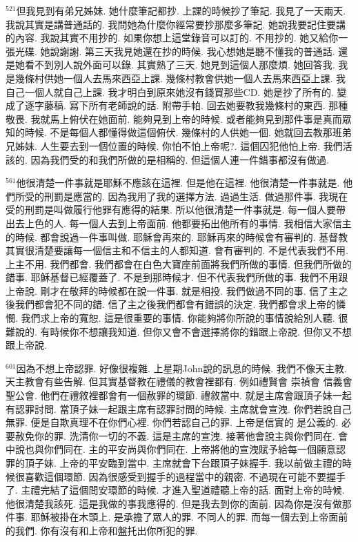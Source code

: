 \documentclass{book}
\begin{document}
$^{521}$但我見到有弟兄姊妹.
她什麼筆記都抄.
上課的時候抄了筆記.
我見了一天兩天.
我說其實是講普通話的.
我問她為什麼你經常要抄那麼多筆記.
她說我要記住要講的內容.
我說其實不用抄的.
如果你想上這堂錄音可以訂的.
不用抄的.
她又給你一張光碟.
她說謝謝.
第三天我見她還在抄的時候.
我心想她是聽不懂我的普通話.
還是她看不到別人說外面可以錄.
其實熟了三天.
她見到這個人那麼煩.
她回答我.
我是幾條村供她一個人去馬來西亞上課.
幾條村教會供她一個人去馬來西亞上課.
我自己一個人就自己上課.
我才明白到原來她沒有錢買那些CD.
她是抄了所有的.
變成了逐字藤稿.
寫下所有老師說的話.
附帶手帕.
回去她要教我幾條村的東西.
那種敬畏.
我就馬上俯伏在她面前.
能夠見到上帝的時候.
或者能夠見到那件事是真而眾知的時候.
不是每個人都懂得做這個俯伏.
幾條村的人供她一個.
她就回去教那班弟兄姊妹.
人生要去到一個位置的時候.
你怕不怕上帝呢?.
這個囚犯他怕上帝.
我們活該的.
因為我們受的和我們所做的是相稱的.
但這個人連一件錯事都沒有做過.

$^{561}$他很清楚一件事就是耶穌不應該在這裡.
但是他在這裡.
他很清楚一件事就是.
他們所受的刑罰是應當的.
因為我用了我的選擇方法.
過過生活.
做過那件事.
我現在受的刑罰是叫做履行他罪有應得的結果.
所以他很清楚一件事就是.
每一個人要帶出去上色的人.
每一個人去到上帝面前.
他都要拓出他所有的事情.
我相信大家信主的時候.
都會說過一件事叫做.
耶穌會再來的.
耶穌再來的時候會有審判的.
基督教其實很清楚要讓每一個信主和不信主的人都知道.
會有審判的.
不是代表我們不用.
上主不用.
我們都會.
我們都會在白色大寶座前面將我們所做的事情.
但我們所做的錯事.
耶穌基督已經覆蓋了.
不是到那時候才.
但不代表我們所做的事.
我們不用跟上帝說.
剛才在敬拜的時候都在說一件事.
就是相投.
我們做過不同的事.
信了主之後我們都會犯不同的錯.
信了主之後我們都會有錯誤的決定.
我們都會求上帝的憐憫.
我們求上帝的寬恕.
這是很重要的事情.
你能夠將你所說的事情說給別人聽.
很難說的.
有時候你不想讓我知道.
但你又會不會選擇將你的錯跟上帝說.
但你又不想跟上帝說.

$^{601}$因為不想上帝認罪.
好像很複雜.
上星期John說的訊息的時候.
我們不像天主教.
天主教會有些告解.
但其實基督教在禮儀的教會裡都有.
例如禮賢會 崇禎會 信義會 聖公會.
他們在禮敘裡都會有一個赦罪的環節.
禮敘當中.
就是主席會跟頂子妹一起有認罪討問.
當頂子妹一起跟主席有認罪討問的時候.
主席就會宣洩.
你們若說自己無罪.
便是自欺真理不在你們心裡.
你們若認自己的罪.
上帝是信實的 是公義的.
必要赦免你的罪.
洗清你一切的不義.
這是主席的宣洩.
接著他會說主與你們同在.
會中說也與你們同在.
主的平安尚與你們同在.
上帝將他的宣洩賦予給每一個願意認罪的頂子妹.
上帝的平安臨到當中.
主席就會下台跟頂子妹握手.
我以前做主禮的時候很喜歡這個環節.
因為很感受到握手的過程當中的親密.
不過現在可能不要握手了.
主禮完結了這個問安環節的時候.
才進入聖道禮聽上帝的話.
面對上帝的時候.
他很清楚我該死.
這是我做的事我應得的.
但是我去到你的面前.
因為你是沒有做那件事.
耶穌被掛在木頭上.
是承擔了眾人的罪.
不同人的罪.
而每一個去到上帝面前的我們.
你有沒有和上帝和盤托出你所犯的罪.
\end{document}
